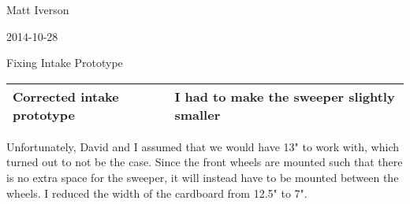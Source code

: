 Matt Iverson

2014-10-28

Fixing Intake Prototype

\begin{tabular}{|p{5cm}|p{5cm}|}
 \hline
 Corrected intake prototype&
 I had to make the sweeper slightly smaller \\
 \hline
\end{tabular}

Unfortunately, David and I assumed that we would have 13" to work with, which turned out to not be the case. Since the front wheels are mounted such that there is no extra space for the sweeper, it will instead have to be mounted between the wheels. I reduced the width of the cardboard from 12.5" to 7".
